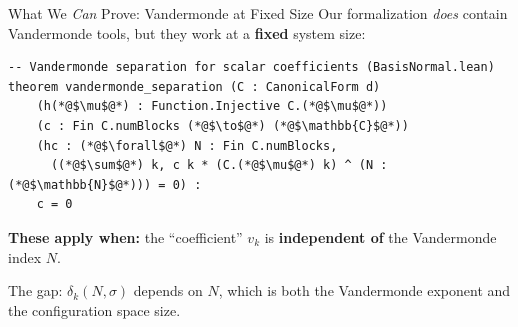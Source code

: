 \documentclass[aspectratio=169,10pt]{beamer}
\begin{document}
\begin{frame}[fragile]{What We \emph{Can} Prove: Vandermonde at Fixed Size}
\vspace{-0.5em}
{\small Our formalization \emph{does} contain Vandermonde tools, but they work at a \textbf{fixed} system size:}

\vspace{0.1em}
\begin{lstlisting}[basicstyle=\ttfamily\fontsize{5}{6.5}\selectfont\color{white}]
-- Vandermonde separation for scalar coefficients (BasisNormal.lean)
theorem vandermonde_separation (C : CanonicalForm d)
    (h(*@$\mu$@*) : Function.Injective C.(*@$\mu$@*))
    (c : Fin C.numBlocks (*@$\to$@*) (*@$\mathbb{C}$@*))
    (hc : (*@$\forall$@*) N : Fin C.numBlocks,
      ((*@$\sum$@*) k, c k * (C.(*@$\mu$@*) k) ^ (N : (*@$\mathbb{N}$@*))) = 0) :
    c = 0
\end{lstlisting}

\vspace{0.05em}
{\small\textbf{These apply when:} the ``coefficient'' $v_k$ is \textbf{independent of} the Vandermonde index $N$.}

\vspace{0.15em}
{\small The gap: $\delta_k(N, \sigma)$ depends on $N$, which is both the Vandermonde exponent and the configuration space size.}

\vspace{0.1em}
{\small{}\quad{}}
\end{frame}
\end{document}
